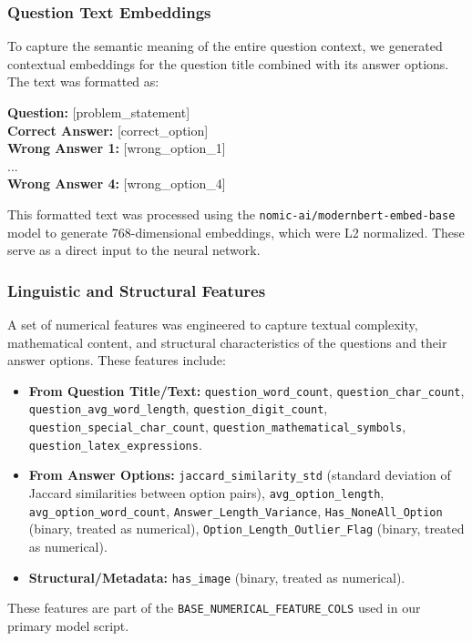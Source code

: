 \documentclass[
    a4paper, %
    10pt, %
    twoside, %
]{LTJournalArticle}
\begin{document}
\subsubsection{Question Text Embeddings}
To capture the semantic meaning of the entire question context, we generated contextual embeddings for the question title combined with its answer options. The text was formatted as:

    \begin{promptbox}
        \textbf{Question:} [problem\_statement]\\
        \textbf{Correct Answer:} [correct\_option]\\
        \textbf{Wrong Answer 1:} [wrong\_option\_1]\\
        ... \\
        \textbf{Wrong Answer 4:} [wrong\_option\_4]
    \end{promptbox}
    
This formatted text was processed using the \texttt{nomic-ai/modernbert-embed-base} model to generate 768-dimensional embeddings, which were L2 normalized. These serve as a direct input to the neural network.

\subsubsection{Linguistic and Structural Features}
A set of numerical features was engineered to capture textual complexity, mathematical content, and structural characteristics of the questions and their answer options. These features include:
\begin{itemize}
    \item \textbf{From Question Title/Text:} \texttt{question\_word\_count}, \texttt{question\_char\_count}, \texttt{question\_avg\_word\_length}, \texttt{question\_digit\_count}, \texttt{question\_special\_char\_count}, \texttt{question\_mathematical\_symbols}, \texttt{question\_latex\_expressions}.
    \item \textbf{From Answer Options:} \texttt{jaccard\_similarity\_std} (standard deviation of Jaccard similarities between option pairs), \texttt{avg\_option\_length}, \texttt{avg\_option\_word\_count}, \texttt{Answer\_Length\_Variance}, \texttt{Has\_NoneAll\_Option} (binary, treated as numerical), \texttt{Option\_Length\_Outlier\_Flag} (binary, treated as numerical).
    \item \textbf{Structural/Metadata:} \texttt{has\_image} (binary, treated as numerical).
\end{itemize}
These features are part of the \texttt{BASE\_NUMERICAL\_FEATURE\_COLS} used in our primary model script.
\end{document}
